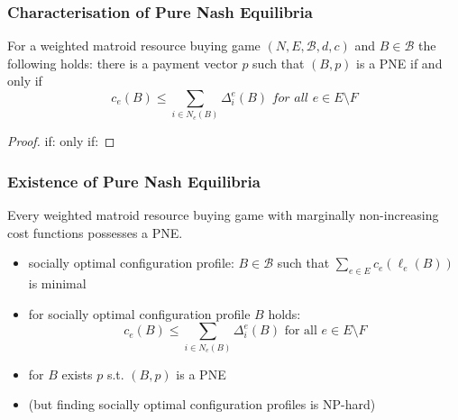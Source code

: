 \documentclass{beamer}
\newcommand{\tupel}[1]{\left(#1\right)}
\begin{document}
\begin{frame}
  \frametitle{Characterisation of Pure Nash Equilibria}
  \begin{theorem}
    For a weighted matroid resource buying game
    $\tupel{N, E, \mathcal{B}, d, c}$ and $B\in\mathcal{B}$ the following
    holds: there is a payment vector $p$ such that $\tupel{B,p}$ is a
    PNE if and only if
    \begin{equation*}
      c_{e}(B) \leq \sum_{i\in N_{e}(B)}\Delta_{i}^{e}(B)
      \textit{ for all }e\in E\setminus F
    \end{equation*}
  \end{theorem}
  \begin{proof}
    if: 
    only if: 
  \end{proof}
\end{frame}

\begin{frame}
  \frametitle{Existence of Pure Nash Equilibria}
  \begin{theorem}
    Every weighted matroid resource buying game with marginally non-increasing
    cost functions possesses a PNE.
  \end{theorem}
  \begin{itemize}
    \item<2-> socially optimal configuration profile: $B\in\mathcal{B}$ such that
      $\sum_{e\in E}c_{e}(\ell_{e}(B))$ is minimal
    \item<3-> for socially optimal configuration profile $B$ holds:
      \begin{equation*}
        c_{e}(B)\leq \sum_{i\in N_{e}(B)}\Delta_{i}^{e}(B)
        \text{ for all }e\in E\setminus F
      \end{equation*}
    \item<4-> for $B$ exists $p$ s.t. $\tupel{B,p}$ is a PNE
    \item<5-> (but finding socially optimal configuration profiles is NP-hard)
  \end{itemize}
\end{frame}
\end{document}
